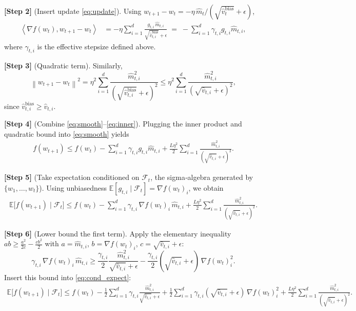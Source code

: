 \documentclass{article}
\newcommand{\E}{\mathbb{E}}
\newcommand{\norm}[1]{\left\|#1\right\|}
\newcommand{\ip}[2]{\left\langle #1,#2\right\rangle}
\begin{document}
\noindent\textbf{[Step 2]} (Insert update \eqref{eq:update}).  
Using $w_{t+1}-w_t = -\eta \,\hat m_t/(\sqrt{\hat v_t^{\text{bias}}}+\epsilon)$,
\begin{align}
\ip{\nabla f(w_t)}{w_{t+1}-w_t}
&= -\eta \sum_{i=1}^{d}
      \frac{g_{t,i}\,\hat m_{t,i}}{\sqrt{\hat v_{t,i}^{\text{bias}}}+\epsilon}
   \;=\;
   -\sum_{i=1}^{d}\gamma_{t,i} g_{t,i}\hat m_{t,i},
   \label{eq:inner}
\end{align}
where $\gamma_{t,i}$ is the effective stepsize defined above.

\noindent\textbf{[Step 3]} (Quadratic term).  
Similarly,
\[
\norm{w_{t+1}-w_t}^{2}
= \eta^{2}\sum_{i=1}^{d}
   \frac{\hat m_{t,i}^{2}}{(\sqrt{\hat v_{t,i}^{\text{bias}}}+\epsilon)^{2}}
\le \eta^{2}\sum_{i=1}^{d}
   \frac{\hat m_{t,i}^{2}}{(\sqrt{\hat v_{t,i}}+\epsilon)^{2}},
\]
since $\hat v_{t,i}^{\text{bias}}\ge \hat v_{t,i}$.

\noindent\textbf{[Step 4]} (Combine \eqref{eq:smooth}–\eqref{eq:inner}).  
Plugging the inner product and quadratic bound into \eqref{eq:smooth} yields
\begin{align}
f(w_{t+1}) \le f(w_t)
 -\sum_{i=1}^{d}\gamma_{t,i} g_{t,i}\hat m_{t,i}
 +\frac{L\eta^{2}}{2}\sum_{i=1}^{d}
   \frac{\hat m_{t,i}^{2}}{(\sqrt{\hat v_{t,i}}+\epsilon)^{2}}.
 \label{eq:one_step}
\end{align}

\noindent\textbf{[Step 5]} (Take expectation conditioned on $\mathcal{F}_t$, the sigma‑algebra generated by $\{w_1,\dots,w_t\}$).  
Using unbiasedness $\E[g_{t,i}\mid\mathcal{F}_t]=\nabla f(w_t)_i$, we obtain
\begin{align}
\E\!\bigl[f(w_{t+1})\mid\mathcal{F}_t\bigr]
\le f(w_t)
 -\sum_{i=1}^{d}\gamma_{t,i}\,\nabla f(w_t)_i\,\hat m_{t,i}
 +\frac{L\eta^{2}}{2}\sum_{i=1}^{d}
   \frac{\hat m_{t,i}^{2}}{(\sqrt{\hat v_{t,i}}+\epsilon)^{2}}.
 \label{eq:cond_expect}
\end{align}

\noindent\textbf{[Step 6]} (Lower bound the first term).  
Apply the elementary inequality $ab\ge \frac{a^{2}}{2c}-\frac{c b^{2}}{2}$ with $a=\hat m_{t,i}$, $b=\nabla f(w_t)_i$, $c=\sqrt{\hat v_{t,i}}+\epsilon$:
\[
\gamma_{t,i}\,\nabla f(w_t)_i\,\hat m_{t,i}
\ge
\frac{\gamma_{t,i}}{2}\frac{\hat m_{t,i}^{2}}{\sqrt{\hat v_{t,i}}+\epsilon}
-
\frac{\gamma_{t,i}}{2}(\sqrt{\hat v_{t,i}}+\epsilon)\,\nabla f(w_t)_i^{2}.
\]
Insert this bound into \eqref{eq:cond_expect}:
\begin{align}
\E\!\bigl[f(w_{t+1})\mid\mathcal{F}_t\bigr]
\le f(w_t)
 -\frac{1}{2}\sum_{i=1}^{d}\gamma_{t,i}
   \frac{\hat m_{t,i}^{2}}{\sqrt{\hat v_{t,i}}+\epsilon}
 +\frac{1}{2}\sum_{i=1}^{d}\gamma_{t,i}
   (\sqrt{\hat v_{t,i}}+\epsilon)\,\nabla f(w_t)_i^{2}
 +\frac{L\eta^{2}}{2}\sum_{i=1}^{d}
   \frac{\hat m_{t,i}^{2}}{(\sqrt{\hat v_{t,i}}+\epsilon)^{2}}.
 \label{eq:after_ineq}
\end{align}
\end{document}
